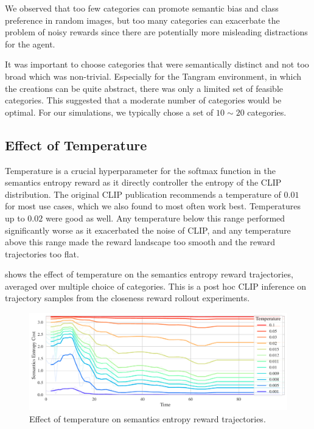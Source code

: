 We observed that too few categories can promote semantic bias and class preference in random images, but too many categories can exacerbate the problem of noisy rewards since there are potentially more misleading distractions for the agent.

It was important to choose categories that were semantically distinct and not too broad which was non-trivial.
Especially for the Tangram environment, in which the creations can be quite abstract, there was only a limited set of feasible categories.
This suggested that a moderate number of categories would be optimal.
For our simulations, we typically chose a set of \(10 \sim 20\) categories.

\subsection{Effect of Temperature}
\label{sec:reg-temperature}

Temperature is a crucial hyperparameter for the softmax function in the semantics entropy reward as it directly controller the entropy of the CLIP distribution.
The original CLIP publication recommends a temperature of \(0.01\) for most use cases, which we also found to most often work best.
Temperatures up to \(0.02\) were good as well.
Any temperature below this range performed significantly worse as it exacerbated the noise of CLIP, and any temperature above this range made the reward landscape too smooth and the reward trajectories too flat.

 shows the effect of temperature on the semantics entropy reward trajectories, averaged over multiple choice of categories.
This is a post hoc CLIP inference on trajectory samples from the closeness reward rollout experiments.

\begin{figure}[H]
    \centering
    \includegraphics[width=\textwidth]{images/temperature_comparison.pdf}
    \caption{Effect of temperature on semantics entropy reward trajectories.}
    \label{fig:clip-temperature}    
\end{figure}

